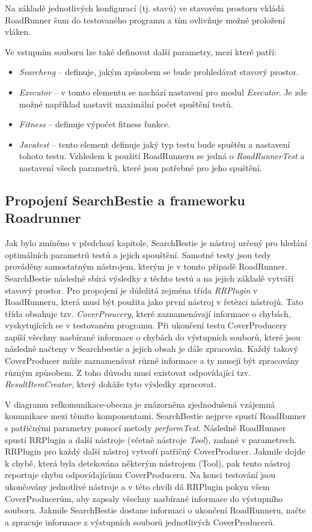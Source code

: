 Na základě jednotlivých konfigurací (tj. stavů) ve stavovém prostoru vkládá RoadRunner šum do testovaného programu a tím ovlivňuje možné proložení vláken.

Ve vstupním souboru lze také definovat další parametry, mezi které patří:

\begin{itemize}
\item \textit{Searcheng} -- definuje, jakým způsobem se bude prohledávat stavový prostor.
\item \textit{Executor} -- v tomto elementu se nachází nastavení pro modul \textit{Executor}. Je zde možné například nastavit maximální počet spuštění testů.
\item \textit{Fitness} -- definuje výpočet fitness funkce.
\item \textit{Javatest} -- tento element definuje jaký typ testu bude spuštěn a nastavení tohoto testu. Vzhledem k použití RoadRunneru se jedná o \textit{RoadRunnerTest} a nastavení všech parametrů, které jsou potřebné pro jeho spuštění. 
\end{itemize}

\subsection{Propojení SearchBestie a frameworku Roadrunner}\label{propojeni-sb-rr}

Jak bylo zmíněno v předchozí kapitole, SearchBestie je nástroj určený pro hledání optimálních parametrů testů a jejich spouštění. Samotné testy jsou tedy prováděny samostatným nástrojem, kterým je v tomto případě RoadRunner. SearchBestie následně sbírá výsledky z těchto testů a na jejich základě vytváří stavový prostor. Pro propojení je důležitá zejména třída \textit{RRPlugin} v RoadRunneru, která musí být použita jako první nástroj v řetězci nástrojů. Tato třída obsahuje tzv. \textit{CoverProucery}, které zaznamenávají informace o chybách, vyskytujících se v testovaném programu. Při ukončení testu CoverProducery zapíší všechny nasbírané informace o chybách do výstupních souborů, které jsou následně načteny v Searchbestie a jejich obsah je dále zpracován. Každý takový CoverProducer může zaznamenávat různé informace a ty musejí být zpracovány různým způsobem. Z toho důvodu musí existovat odpovídající tzv. \textit{ResultItemCreator}, který dokáže tyto výsledky zpracovat.

V diagramu ref{komunikace-obecna} je znázorněna zjednodušená vzájemná komunikace mezi těmito komponentami. SearchBestie nejprve spustí RoadRunner s patřičnými parametry pomocí metody \textit{performTest}. Následně RoadRunner spustí RRPlugin a další nástroje (včetně nástroje \textit{Tool}), zadané v parametrech. RRPlugin pro každý další nástroj vytvoří patřičný CoverProducer. Jakmile dojde k chybě, která byla detekována některým nástrojem (Tool), pak tento nástroj reportuje chybu odpovídajícímu CoverProduceru. Na konci testování jsou ukončovány jednotlivé nástroje a v této chvíli dá RRPlugin pokyn všem CoverProducerům, aby zapsaly všechny nasbírané informace do výstupního souboru. Jakmile SearchBestie dostane informaci o ukončení RoadRunneru, načte a zpracuje informace z výstupních souborů jednotlivých CoverProducerů.

